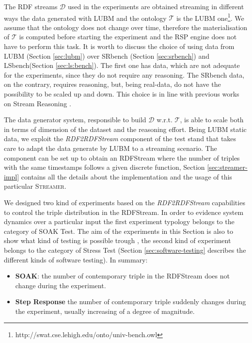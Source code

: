 The RDF streams  $\mathcal{D}$ used in the experiments are obtained streaming in different ways the data generated with LUBM  \cite{Guo2005} and the ontology $\mathcal{T}$ is the LUBM one\footnote{http://swat.cse.lehigh.edu/onto/univ-bench.owl}. We assume that the ontology does not change over time, therefore the materialisation of $\mathcal{T}$ is computed before starting the experiment and the RSP engine does not have to perform this task. It is worth to discuss the choice of using data from LUBM (Section \ref{sec:lubm}) over SRbench (Section \ref{sec:srbench}) and LSbench(Section \ref{sec:ls:bench}). The first one has data, which are not adequate for the experiments, since they do not require any reasoning. The SRbench data, on the contrary, requires reasoning, but, being real-data, do not have the possibility to be scaled up and down. This choice is in line with previous works on Stream Reasoning \cite{DBLP:conf/semweb/UrbaniMJHB13}. 

The data generator system, responsible to build $\mathcal{D}$ w.r.t. $\mathcal{T}$, is able to scale both in terms of dimension of the dataset and the reasoning effort. Being LUBM static data, we exploit the \textit{RDF2RDFStream} component of the test stand that takes care to adapt the data generate by LUBM to a streaming scenario. The component can be set up to obtain an RDFStream where the number of triples with the same timestamps follows a given discrete function, Section \ref{sec:streamer-impl} contains all the details about the implementation and the usage of this particular \textsc{Streamer}. %

We designed two kind of experiments based on the \textit{RDF2RDFStream} capabilities to control the triple distribution in the RDFStream. In order to evidence system dynamics over a particular input the first experiment typology belongs to the category of SOAK Test. The aim of the experiments in this Section is also to show what kind of testing is possible trough \namens, the second kind of experiment belongs to the category of Stress Test (Section \ref{sec:software-testing} describes the different kinds of software testing). In summary:

\begin{itemize}
\item \textbf{SOAK}: the number of contemporary triple in the RDFStream does not change during the experiment.
\item \textbf{Step Response} the number of contemporary triple suddenly changes during the experiment, usually increasing of a degree of magnitude.
\end{itemize}
 
